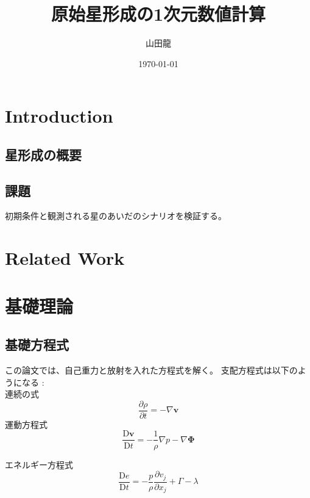 \documentclass{jsarticle}
\date{\today}
\author{山田龍}
\title{原始星形成の1次元数値計算}
\newcommand{\bv}{\mathbf{v}}
\newcommand{\pder}[2][]{\frac{\partial#1}{\partial#2}}
\newcommand{\Dder}[2][]{\frac{\mathrm{D}#1}{\mathrm{D}#2}}
\begin{document}
\maketitle
\section{Introduction}
\subsection{星形成の概要}

\subsection{課題}
初期条件と観測される星のあいだのシナリオを検証する。

\section{Related Work}
\section{基礎理論}
\subsection{基礎方程式}
この論文では、自己重力と放射を入れた方程式を解く。
支配方程式は以下のようになる :\\
連続の式
\begin{equation}
    \pder[\rho]{t} = - \nabla \bv
\end{equation}
運動方程式
\begin{equation}
    \Dder[\bv]{t} = - \frac{1}{\rho}\nabla{p} - \nabla\mathbf{\Phi}
\end{equation}

エネルギー方程式
\begin{equation}
    \Dder[e]{t} = - \frac{p}{\rho} \pder[v_j]{x_j} + \Gamma - \lambda
\end{equation}
\end{document}
